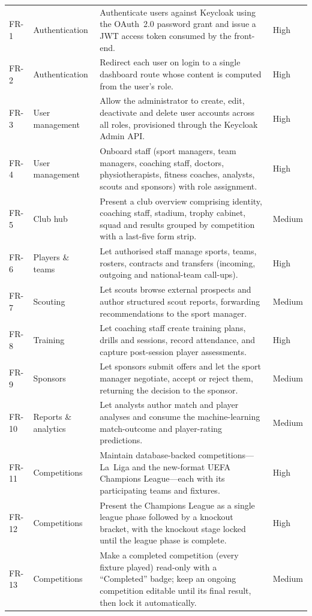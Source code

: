 \begin{longtable}{p{} p{} p{} p{}}
FR-1  & Authentication & Authenticate users against Keycloak using the OAuth~2.0 password grant and issue a JWT access token consumed by the front-end. & High \\
FR-2  & Authentication & Redirect each user on login to a single dashboard route whose content is computed from the user's role. & High \\
FR-3  & User management & Allow the administrator to create, edit, deactivate and delete user accounts across all roles, provisioned through the Keycloak Admin API. & High \\
FR-4  & User management & Onboard staff (sport managers, team managers, coaching staff, doctors, physiotherapists, fitness coaches, analysts, scouts and sponsors) with role assignment. & High \\
FR-5  & Club hub & Present a club overview comprising identity, coaching staff, stadium, trophy cabinet, squad and results grouped by competition with a last-five form strip. & Medium \\
FR-6  & Players \& teams & Let authorised staff manage sports, teams, rosters, contracts and transfers (incoming, outgoing and national-team call-ups). & High \\
FR-7  & Scouting & Let scouts browse external prospects and author structured scout reports, forwarding recommendations to the sport manager. & Medium \\
FR-8  & Training & Let coaching staff create training plans, drills and sessions, record attendance, and capture post-session player assessments. & High \\
FR-9  & Sponsors & Let sponsors submit offers and let the sport manager negotiate, accept or reject them, returning the decision to the sponsor. & Medium \\
FR-10 & Reports \& analytics & Let analysts author match and player analyses and consume the machine-learning match-outcome and player-rating predictions. & Medium \\
FR-11 & Competitions & Maintain database-backed competitions---La~Liga and the new-format UEFA Champions League---each with its participating teams and fixtures. & High \\
FR-12 & Competitions & Present the Champions League as a single league phase followed by a knockout bracket, with the knockout stage locked until the league phase is complete. & High \\
FR-13 & Competitions & Make a completed competition (every fixture played) read-only with a ``Completed'' badge; keep an ongoing competition editable until its final result, then lock it automatically. & Medium \\

\end{longtable}
